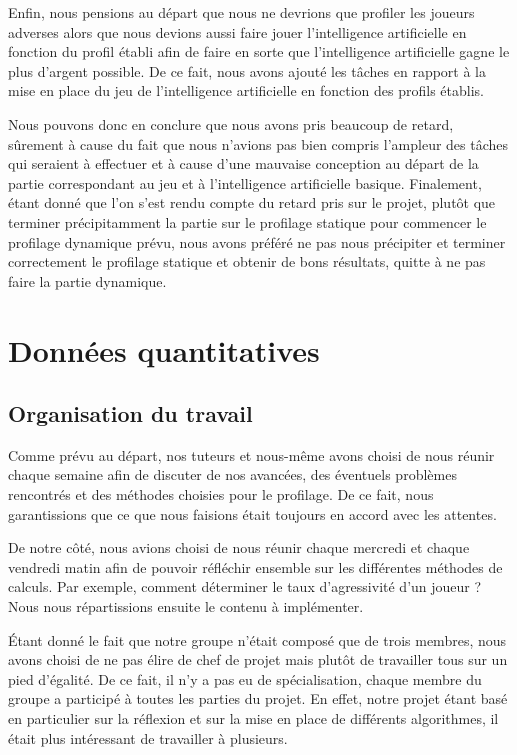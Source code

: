 \documentclass{report}
\begin{document}
Enfin, nous pensions au départ que nous ne devrions que profiler les joueurs adverses alors que nous devions aussi faire jouer l'intelligence artificielle en fonction du profil établi afin de faire en sorte que l'intelligence artificielle gagne le plus d'argent possible. De ce fait, nous avons ajouté les tâches en rapport à la mise en place du jeu de l'intelligence artificielle en fonction des profils établis. \par

Nous pouvons donc en conclure que nous avons pris beaucoup de retard, sûrement à cause du fait que nous n'avions pas bien compris l'ampleur des tâches qui seraient à effectuer et à cause d'une mauvaise conception au départ de la partie correspondant au jeu et à l'intelligence artificielle basique. Finalement, étant donné que l'on s'est rendu compte du retard pris sur le projet, plutôt que terminer précipitamment la partie sur le profilage statique pour commencer le profilage dynamique prévu, nous avons préféré ne pas nous précipiter et terminer correctement le profilage statique et obtenir de bons résultats, quitte à ne pas faire la partie dynamique. \par


\chapter{Données quantitatives}

\section{Organisation du travail}
\hspace{0.5cm}Comme prévu au départ, nos tuteurs et nous-même avons choisi de nous réunir chaque semaine afin de discuter de nos avancées, des éventuels problèmes rencontrés et des méthodes choisies pour le profilage. De ce fait, nous garantissions que ce que nous faisions était toujours en accord avec les attentes.\par
De notre côté, nous avions choisi de nous réunir chaque mercredi et chaque vendredi matin afin de pouvoir réfléchir ensemble sur les différentes méthodes de calculs. Par exemple, comment déterminer le taux d'agressivité d'un joueur ? Nous nous répartissions ensuite le contenu à implémenter.\par
Étant donné le fait que notre groupe n'était composé que de trois membres, nous avons choisi de ne pas élire de chef de projet mais plutôt de travailler tous sur un pied d'égalité. De ce fait, il n'y a pas eu de spécialisation, chaque membre du groupe a participé à toutes les parties du projet. En effet, notre projet étant basé en particulier sur la réflexion et sur la mise en place de différents algorithmes, il était plus intéressant de travailler à plusieurs.\par
\end{document}
